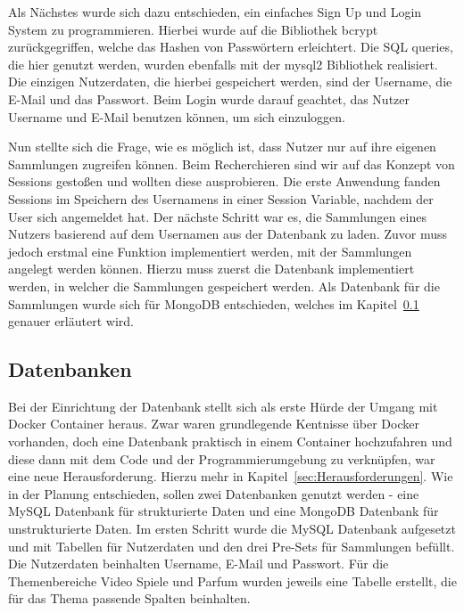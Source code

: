 % 

Als Nächstes wurde sich dazu entschieden, ein einfaches Sign Up und Login System zu programmieren.
Hierbei wurde auf die Bibliothek bcrypt zurückgegriffen, welche das Hashen von Passwörtern erleichtert.
Die SQL queries, die hier genutzt werden, wurden ebenfalls mit der mysql2 Bibliothek realisiert.
Die einzigen Nutzerdaten, die hierbei gespeichert werden, sind der Username, die E-Mail und das Passwort.
Beim Login wurde darauf geachtet, das Nutzer Username und E-Mail benutzen können, um sich einzuloggen.

Nun stellte sich die Frage, wie es möglich ist, dass Nutzer nur auf ihre eigenen Sammlungen zugreifen können.
Beim Recherchieren sind wir auf das Konzept von Sessions gestoßen und wollten diese ausprobieren.
Die erste Anwendung fanden Sessions im Speichern des Usernamens in einer Session Variable, nachdem der User sich angemeldet hat.
Der nächste Schritt war es, die Sammlungen eines Nutzers basierend auf dem Usernamen aus der Datenbank zu laden.
Zuvor muss jedoch erstmal eine Funktion implementiert werden, mit der Sammlungen angelegt werden können.
Hierzu muss zuerst die Datenbank implementiert werden, in welcher die Sammlungen gespeichert werden.
Als Datenbank für die Sammlungen wurde sich für MongoDB entschieden, welches im Kapitel~\ref{subsec:Datenbanken} genauer erläutert wird.

\subsection{Datenbanken}\label{subsec:Datenbanken}

Bei der Einrichtung der Datenbank stellt sich als erste Hürde der Umgang mit Docker Container heraus.
Zwar waren grundlegende Kentnisse über Docker vorhanden, doch eine Datenbank praktisch in einem Container hochzufahren und diese dann mit dem Code und der Programmierumgebung zu verknüpfen, war eine neue Herausforderung.
Hierzu mehr in Kapitel~\ref{sec:Herausforderungen}.
Wie in der Planung entschieden, sollen zwei Datenbanken genutzt werden - eine MySQL Datenbank für strukturierte Daten und eine MongoDB Datenbank für unstrukturierte Daten.
Im ersten Schritt wurde die MySQL Datenbank aufgesetzt und mit Tabellen für Nutzerdaten und den drei Pre-Sets für Sammlungen befüllt.
Die Nutzerdaten beinhalten Username, E-Mail und Passwort.
Für die Themenbereiche Video Spiele und Parfum wurden jeweils eine Tabelle erstellt, die für das Thema passende Spalten beinhalten.

